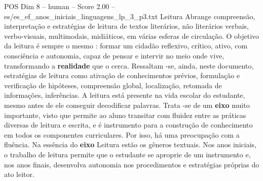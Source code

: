 \begin{textsample}{POS Dim 8 – human – Score 2.00 – es/es\_ef\_anos\_iniciais\_linguagens\_lp\_3\_p3.txt}  \label{ex:f8_pos_010}
Leitura Abrange compreensão, interpretação e estratégias de leitura de textos literários, não literários verbais, verbo-visuais, multimodais, midiáticos, em várias esferas de circulação.
O objetivo da leitura é sempre o mesmo : formar um cidadão reflexivo, crítico, ativo, com consciência e autonomia, capaz de pensar e intervir no meio onde vive, transformando a \textbf{realidade} que o cerca.
Ressaltam -se, ainda, neste documento, estratégias de leitura como ativação de conhecimentos prévios, formulação e verificação de hipóteses, compreensão global, localização, retomada de informações, inferências.
A leitura está presente na vida escolar do estudante, mesmo antes de ele conseguir decodificar palavras.
Trata -se de um \textbf{eixo} muito importante, visto que permite ao aluno transitar com fluidez entre as práticas diversas de leitura e escrita, e é instrumento para a construção de conhecimento em todos os componentes curriculares.
Por isso, há uma preocupação com a fluência.
Na essência do \textbf{eixo} Leitura estão os gêneros textuais.
Nos anos iniciais, o trabalho de leitura permite que o estudante se aproprie de um instrumento e, nos anos finais, desenvolva autonomia nos procedimentos e estratégias próprias do ato leitor.

\end{textsample}
